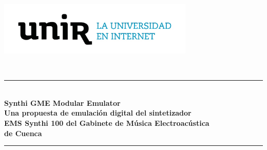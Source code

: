 \begin{titlepage}

\newcommand{\HRule}{\rule{\linewidth}{0.5mm}} %

\center %


\includegraphics[width=0.7\textwidth]{./portada/logo.jpg}\\[1cm] %
 

\fontsize{24pt}{28.8pt}\selectfont{}

\fontsize{20pt}{28.8pt}\selectfont{}
\\[1cm] 


\HRule \\[0.0cm]
{ \Large \bfseries Synthi GME Modular Emulator\\ \vspace{0.4cm} \normalsize Una propuesta de emulación digital del sintetizador\\ EMS Synthi 100 del Gabinete de Música Electroacústica\\de Cuenca}\\[0.1cm] %
\HRule \\[0.3cm]
 


\end{titlepage}
